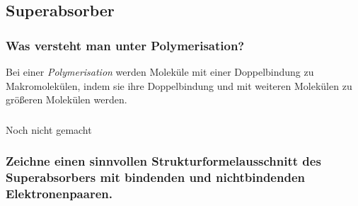 \documentclass[../../main.tex]{subfiles}
\begin{document}
\subsection{Superabsorber}
%
\subsubsection{Was versteht man unter Polymerisation?}
Bei einer \textit{Polymerisation} werden Moleküle mit einer Doppelbindung zu
Makromolekülen, indem sie ihre Doppelbindung  und mit weiteren
Molekülen zu größeren Molekülen werden.
%
\subsubsection{}
Noch nicht gemacht
%
\subsubsection{Zeichne einen sinnvollen Strukturformelausschnitt des Superabsorbers mit bindenden und nichtbindenden Elektronenpaaren.}
\end{document}
